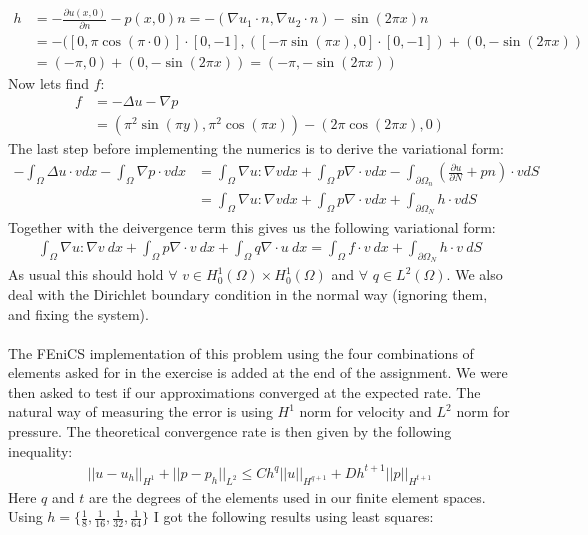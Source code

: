 \documentclass[11pt,a4paper]{report}
\begin{document}
\begin{align*}
h &= -\frac{\partial u(x,0)}{\partial n} - p(x,0)n  = -(\nabla u_1\cdot n,\nabla u_2\cdot n) -\sin(2\pi x)n\\
&= -( [0,\pi \cos(\pi \cdot0)] \cdot[0,-1], ( [-\pi \sin(\pi x),0]\cdot[0,-1]) +(0,-\sin(2\pi x)) \\
& = (-\pi,0)+(0,-\sin(2\pi x)) = (-\pi,-\sin(2\pi x))
\end{align*}
Now lets find $f$:
\begin{align*}
f &= -\Delta u - \nabla p \\
&= (\pi^2 \sin(\pi y),\pi^2 \cos(\pi x)) - (2\pi\cos(2\pi x),0) 
\end{align*} 
The last step before implementing the numerics is to derive the variational form:
\begin{align*}
-\int_{\Omega} \Delta u \cdot v  dx - \int_{\Omega} \nabla p \cdot v  dx &= \int_{\Omega} \nabla u :\nabla v  dx + \int_{\Omega} p \nabla\cdot v  dx -\int_{\partial\Omega_n}(\frac{\partial u}{\partial N} + pn)\cdot v  dS \\
&=\int_{\Omega} \nabla u :\nabla v  dx + \int_{\Omega} p \nabla\cdot v  dx +\int_{\partial\Omega_N}h\cdot v  dS 
\end{align*}
Together with the deivergence term this gives us the following variational form:
\begin{align*}
\int_{\Omega} \nabla u :\nabla v \ dx + \int_{\Omega} p \nabla\cdot v \ dx +\int_{\Omega} q\nabla\cdot u  \ dx = \int_{\Omega} f\cdot v \ dx +\int_{\partial\Omega_N}h\cdot v \ dS 
\end{align*}
As usual this should hold $\forall$ $v \in H_0^1(\Omega)\times H_0^1(\Omega)$ and $\forall$ $q \in L^2(\Omega)$. We also deal with the Dirichlet boundary condition in the normal way (ignoring them, and fixing the system). 
\\
\\
The FEniCS implementation of this problem using the four combinations of elements asked for in the exercise is added at the end of the assignment. We were then asked to test if our approximations converged at the expected rate. The natural way of measuring the error is using $H^1$ norm for velocity and $L^2$ norm for pressure. The theoretical convergence rate is then given by the following inequality:
\begin{align*}
||u-u_h||_{H^1}+||p-p_h||_{L^2} \leq Ch^{q}||u||_{H^{q+1}}+Dh^{t+1}||p||_{H^{t+1}}
\end{align*}
Here $q$ and $t$ are the degrees of the elements used in our finite element spaces. Using $h=\{\frac{1}{8},\frac{1}{16}, \frac{1}{32},\frac{1}{64}\}$ I got the following results using least squares:
\end{document}
